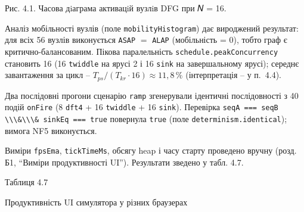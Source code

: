\documentclass[
]{article}
\newcommand{\passthrough}[1]{#1}
\begin{document}
Рис. 4.1. Часова дiаграма активацiй вузлiв DFG при 𝑁 = 16.

Аналіз мобільності вузлів (поле
\passthrough{\lstinline!mobilityHistogram!}) дає вироджений результат:
для всіх 56 вузлів виконується \passthrough{\lstinline!ASAP!} \(=\)
\passthrough{\lstinline!ALAP!} (мобільність = 0), тобто граф є
критично-балансованим. Пікова паралельність
\passthrough{\lstinline!schedule.peakConcurrency!} становить 16 (16
\passthrough{\lstinline!twiddle!} на ярусі 2 і 16
\passthrough{\lstinline!sink!} на завершальному ярусі); середнє
завантаження за цикл -- \(T_{ps}/(T_{kr} \cdot 16) \approx 11,8\,\%\)
(інтерпретація -- у п.~4.4).

Два послідовні прогони сценарію \passthrough{\lstinline!ramp!}
згенерували ідентичні послідовності з 40 подій
\passthrough{\lstinline!onFire!} (8 \passthrough{\lstinline!dft4!} + 16
\passthrough{\lstinline!twiddle!} + 16 \passthrough{\lstinline!sink!}).
Перевірка
\passthrough{\lstinline!seqA!}\passthrough{\lstinline! === !}\passthrough{\lstinline!seqB!}\passthrough{\lstinline! \\\&\\\& !}\passthrough{\lstinline!sinkEq!}\passthrough{\lstinline! === true!}
повернула \passthrough{\lstinline!true!} (поле
\passthrough{\lstinline!determinism.identical!}); вимога NF5
виконується.

Виміри \passthrough{\lstinline!fpsEma!},
\passthrough{\lstinline!tickTimeMs!}, обсягу heap і часу старту
проведено вручну (розд. Б1, ``Виміри продуктивності UI''). Результати
зведено у табл. 4.7.

Таблиця 4.7

Продуктивність UI симулятора у різних браузерах
\end{document}
